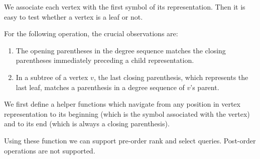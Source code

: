 We associate each vertex with the first symbol of its representation.
Then it is easy to test whether a vertex is a leaf or not.

\begin{algorithmic}
	\State {}
\EndFunction
\end{algorithmic}

\begin{algorithmic}
	\State {} 
\EndFunction
\end{algorithmic}

For the following operation, the crucial observations are:
\begin{enumerate}
	\item The opening parentheses in the degree sequence matches the closing parentheses immediately preceding a child representation.
	\item In a subtree of a vertex $v$, the last closing parenthesis, which represents the last leaf, matches a parenthesis in a degree sequence of $v$'s parent.
\end{enumerate}

We first define a helper functions which navigate from any position in vertex representation to its beginning (which is the symbol associated with the vertex) and to its end (which is always a closing parenthesis).

\begin{algorithmic}
		\State {} 
		\State {} 
	\Else
		\State {}
	\EndIf
\EndFunction
\end{algorithmic}

\begin{algorithmic}
		\State {}
	\Else
		\State {}
	\EndIf
\EndFunction
\end{algorithmic}

\begin{algorithmic}
 
		\State {}
	\Else
		\State {}
	\EndIf
\EndFunction
\end{algorithmic}

Using these function we can support pre-order rank and select queries.
Post-order operations are not supported.


